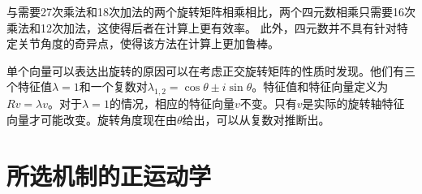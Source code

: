 
与需要27次乘法和18次加法的两个旋转矩阵相乘相比，两个四元数相乘只需要16次乘法和12次加法，这使得后者在计算上更有效率。 此外，四元数并不具有针对特定关节角度的奇异点，使得该方法在计算上更加鲁棒。


单个向量可以表达出旋转的原因可以在考虑正交旋转矩阵的性质时发现。他们有三个特征值$\lambda=1$和一个复数对$\lambda_{1,2}=\cos\theta \pm i \sin \theta$。特征值和特征向量定义为$Rv=\lambda v$。对于$\lambda=1$的情况，相应的特征向量$v$不变。只有$v$是实际的旋转轴特征向量才可能改变。旋转角度现在由$\theta$给出，可以从复数对推断出。

\section{所选机制的正运动学}


